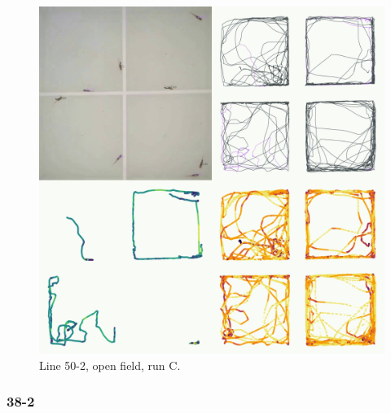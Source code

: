 \documentclass[
]{book}
\begin{document}
\begin{figure}
\includegraphics[width=1\linewidth]{figs/mikk_behaviour/four_panel_plots/open_field_20191120_1150_50-2_R_C_300} \caption{Line 50-2, open field, run C.}\label{fig:4p-50-2-of-C}
\end{figure}

\hypertarget{section-4}{%
\subsubsection{38-2}\label{section-4}}
\end{document}
